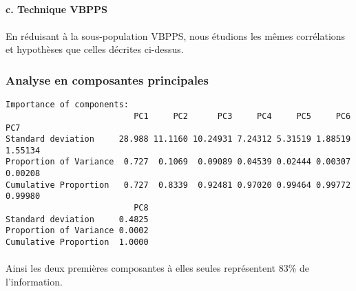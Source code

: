 \documentclass[11pt]{article}
\begin{document}
    \begin{center}
    \end{center}
    
    
    \paragraph{c. Technique VBPPS}\label{c.-technique-vbpps}



    \begin{center}
    \end{center}
    
    
\paragraph{}En réduisant à la sous-population VBPPS, nous étudions les mêmes
corrélations et hypothèses que celles décrites ci-dessus.

    \subsubsection{Analyse en composantes principales}\label{analyse-en-composantes-principales}



    
    \begin{verbatim}
Importance of components:
                          PC1     PC2      PC3     PC4     PC5     PC6     PC7
Standard deviation     28.988 11.1160 10.24931 7.24312 5.31519 1.88519 1.55134
Proportion of Variance  0.727  0.1069  0.09089 0.04539 0.02444 0.00307 0.00208
Cumulative Proportion   0.727  0.8339  0.92481 0.97020 0.99464 0.99772 0.99980
                          PC8
Standard deviation     0.4825
Proportion of Variance 0.0002
Cumulative Proportion  1.0000
    \end{verbatim}
    
\paragraph{}Ainsi les deux premières composantes à elles seules représentent 83\% de
l'information.



    
    
    \begin{center}
    \end{center}
    
\end{document}
